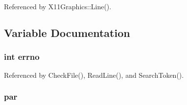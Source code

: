 Referenced by X11\-Graphics\-::\-Line().



\subsection{Variable Documentation}
\subsubsection[{errno}]{\setlength{\rightskip}{0pt plus 5cm}int errno}\label{x11graph_8cpp_ad65a8842cc674e3ddf69355898c0ecbf}


Referenced by Check\-File(), Read\-Line(), and Search\-Token().

\subsubsection[{par}]{ par}\label{x11graph_8cpp_aa11a52593a908c20a7259a3e72c0b348}
